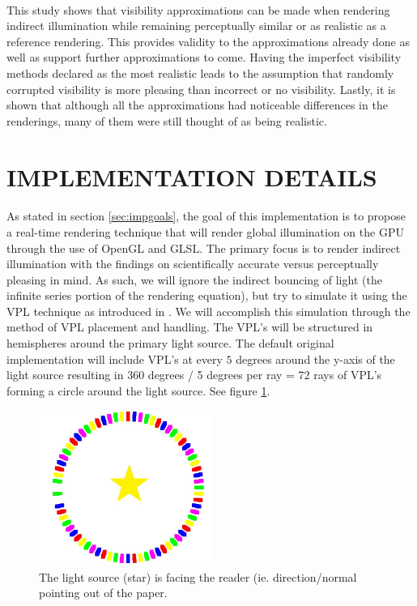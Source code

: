 \paragraph{}
This study shows that visibility approximations can be made when rendering indirect illumination while remaining perceptually similar or as realistic as a reference rendering.  This provides validity to the approximations already done as well as support further approximations to come.  Having the imperfect visibility methods declared as the most realistic leads to the assumption that randomly corrupted visibility is more pleasing than incorrect or no visibility.  Lastly, it is shown that although all the approximations had noticeable differences in the renderings, many of them were still thought of as being realistic.

\section{IMPLEMENTATION DETAILS} \label{sec:impdetails}
\paragraph{}
As stated in section \ref{sec:impgoals}, the goal of this implementation is to propose a real-time rendering technique that will render global illumination on the GPU through the use of OpenGL and GLSL.  The primary focus is to render indirect illumination with the findings on scientifically accurate versus perceptually pleasing in mind.  As such, we will ignore the indirect bouncing of light (the infinite series portion of the rendering equation), but try to simulate it using the VPL technique as introduced in \cite{Keller1997}.  We will accomplish this simulation through the method of VPL placement and handling.  The VPL's will be structured in hemispheres around the primary light source.  The default original implementation will include VPL's at every $5$ degrees around the y-axis of the light source resulting in 360 degrees / 5 degrees per ray = 72 rays of VPL's forming a circle around the light source. See figure \ref{fig:3.1}.

\begin{figure}[h!]
  \centering
    \includegraphics[width=0.5\textwidth]{Figure31.jpg}
  \caption{The light source (star) is facing the reader (ie. direction/normal pointing out of the paper.}
	\label{fig:3.1}
\end{figure}


